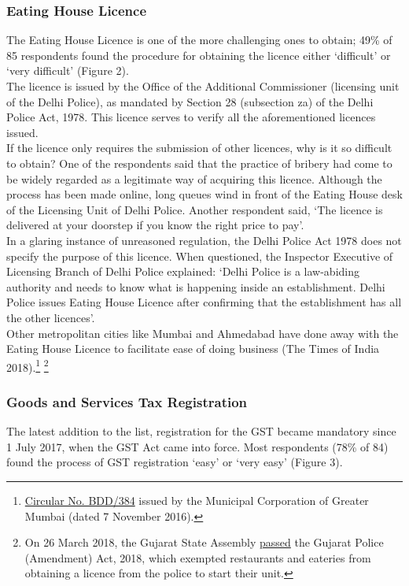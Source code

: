 \documentclass[a4paper, 12pt]{article}
\begin{document}
                   \subsubsection{Eating House Licence}
                   The Eating House Licence is one of the more challenging ones to obtain; 49\% of 85 respondents found the procedure for obtaining the licence either ‘difficult’ or ‘very difficult’ (Figure 2).\\
                   The licence is issued by the Office of the Additional Commissioner (licensing unit of the Delhi Police), as mandated by Section 28 (subsection za) of the Delhi Police Act, 1978. This licence serves to verify all the aforementioned licences issued.\\
                   If the licence only requires the submission of other licences, why is it so difficult to obtain? One of the respondents said that the practice of bribery had come to be widely regarded as a legitimate way of acquiring this licence. Although the process has been made online, long queues wind in front of the Eating House desk of the Licensing Unit of Delhi Police. Another respondent said, ‘The licence is delivered at your doorstep if you know the right price to pay’.\\
                   In a glaring instance of unreasoned regulation, the Delhi Police Act 1978 does not specify the purpose of this licence. When questioned, the Inspector Executive of Licensing Branch of Delhi Police explained: ‘Delhi Police is a law-abiding authority and needs to know what is happening inside an establishment. Delhi Police issues Eating House Licence after confirming that the establishment has all the other licences’.\\
                   Other metropolitan cities like Mumbai and Ahmedabad have done away with the Eating House Licence to facilitate ease of doing business (The Times of India 2018).\footnote{\href{https://bit.ly/2xiMwpL}{Circular No. BDD/384} issued by the Municipal Corporation of Greater Mumbai (dated 7 November 2016).} \footnote{On 26 March 2018, the Gujarat State Assembly \href{https://bit.ly/2xktGyu}{passed} the Gujarat Police (Amendment) Act, 2018, which exempted restaurants and eateries from obtaining a licence from the police to start their unit.} %

		\subsubsection{Goods and Services Tax Registration}
		The latest addition to the list, registration for the GST became mandatory since 1 July 2017, when the GST Act came into force. Most respondents (78\% of 84) found the process of GST registration ‘easy’ or ‘very easy’ (Figure 3).
		
\end{document}
